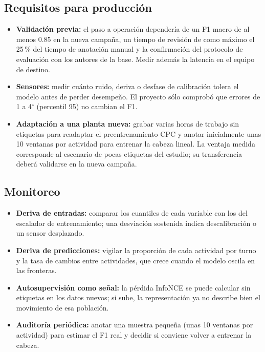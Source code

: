 \documentclass[letterpaper,11pt]{article}
\begin{document}
\subsection{Requisitos para producción}
\begin{itemize}
  \item \textbf{Validación previa:} el paso a operación dependería de un F1 macro de al menos 0.85 en la nueva campaña, un tiempo de revisión de como máximo el 25\,\% del tiempo de anotación manual y la confirmación del protocolo de evaluación con los autores de la base. Medir además la latencia en el equipo de destino.
  \item \textbf{Sensores:} medir cuánto ruido, deriva o desfase de calibración tolera el modelo antes de perder desempeño. El proyecto sólo comprobó que errores de 1 a 4$^\circ$ (percentil 95) no cambian el F1.
  \item \textbf{Adaptación a una planta nueva:} grabar varias horas de trabajo sin etiquetas para readaptar el preentrenamiento CPC y anotar inicialmente unas 10 ventanas por actividad para entrenar la cabeza lineal. La ventaja medida corresponde al escenario de pocas etiquetas del estudio; su transferencia deberá validarse en la nueva campaña.
\end{itemize}

\subsection{Monitoreo}
\begin{itemize}
  \item \textbf{Deriva de entradas:} comparar los cuantiles de cada variable con los del escalador de entrenamiento; una desviación sostenida indica descalibración o un sensor desplazado.
  \item \textbf{Deriva de predicciones:} vigilar la proporción de cada actividad por turno y la tasa de cambios entre actividades, que crece cuando el modelo oscila en las fronteras.
  \item \textbf{Autosupervisión como señal:} la pérdida InfoNCE se puede calcular sin etiquetas en los datos nuevos; si sube, la representación ya no describe bien el movimiento de esa población.
  \item \textbf{Auditoría periódica:} anotar una muestra pequeña (unas 10 ventanas por actividad) para estimar el F1 real y decidir si conviene volver a entrenar la cabeza.
\end{itemize}

\end{document}
